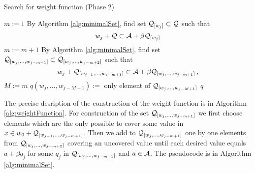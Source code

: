     
\begin{algorithm}
  \caption{Search for weight function (Phase 2)}
    \label{alg:weightFunction}
  \begin{algorithmic}[1]
    \STATE $m:=1$
        \STATE By Algorithm \ref{alg:minimalSet}, find set $\mathcal{Q}_{[w_j]} \subset \mathcal{Q}$ such that
          $$
          w_j + \mathcal{Q} \subset \mathcal{A} + \beta \mathcal{Q}_{[w_j]}
          $$
    \ENDFOR
        \STATE $m:= m +1$
            \STATE By Algorithm \ref{alg:minimalSet}, find set $\mathcal{Q}_{[w_j,\dots, w_{j-m+1}]} \subset \mathcal{Q}_{[w_j,\dots, w_{j-m+2}]}$ such that
              $$
              w_j + \mathcal{Q}_{[w_{j-1},\dots, w_{j-m+1}]} \subset \mathcal{A} + \beta \mathcal{Q}_{[w_j,\dots, w_{j-m+1}]}\,,
              $$
        \ENDFOR  
    \ENDWHILE  
    \STATE $M:= m$ 
        \STATE $q(w_j,\dots, w_{j-M+1}):=$ only element of $\mathcal{Q}_{[w_j,\dots, w_{j-M+1}]}$
    \ENDFOR
    \RETURN $q$
  \end{algorithmic}
\end{algorithm}
    
The precise desription of the construction of the weight function is in  Algorithm \ref{alg:weightFunction}. For construction of the set $\mathcal{Q}_{[w_j,\dots, w_{j-m+1}]}$ we first choose elements which are the only possible to cover some value in $x \in w_0 + \mathcal{Q}_{[w_{j-1},\dots, w_{j-m+1}]}$. Then we add to $\mathcal{Q}_{[w_j,\dots, w_{j-m+1}]}$ one by one elements from $\mathcal{Q}_{[w_j,\dots, w_{j-m+2}]}$ covering an uncovered value until each desired value equals $a+\beta q_j$ for some $q_j$ in $\mathcal{Q}_{[w_j,\dots, w_{j-m+1}]}$ and $a\in\mathcal{A}$. The pseudocode is in Algorithm \ref{alg:minimalSet}. 

